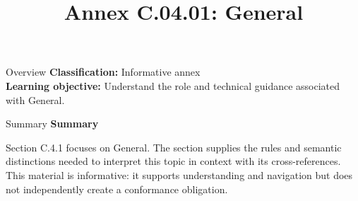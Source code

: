 \documentclass[10pt,letterpaper]{article}
\title{Annex C.04.01: General}
\author{}
\date{}
\begin{document}
\maketitle
\begin{CornellOverviewBox}{Overview}
\textbf{Classification:} Informative annex\\[2pt]
\textbf{Learning objective:} Understand the role and technical guidance associated with General.
\end{CornellOverviewBox}\begin{CornellSummaryBox}{Summary}
{\sffamily\bfseries\color{Accent} Summary}\par\vspace{3pt}Section C.4.1 focuses on General. The section supplies the rules and semantic distinctions needed to interpret this topic in context with its cross-references. This material is informative: it supports understanding and navigation but does not independently create a conformance obligation.
\end{CornellSummaryBox}
\end{document}
